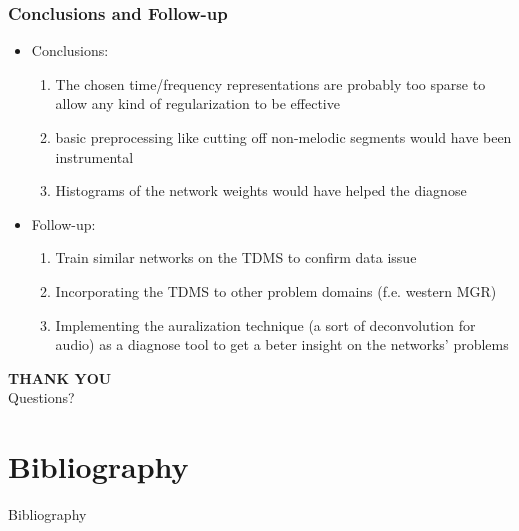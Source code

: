 \documentclass[hyperref={pdfpagelabels=false}]{beamer}
\begin{document}
     \begin{frame}
       \frametitle{Conclusions and Follow-up}
       \begin{itemize}
       \item \Large Conclusions:
         \begin{enumerate}
         \item The chosen time/frequency representations are probably too sparse to allow any kind of regularization to be effective
         \item basic preprocessing like cutting off non-melodic segments would have been instrumental
         \item Histograms of the network weights would have helped the diagnose
         \end{enumerate}
         \vspace{5mm}
       \item \Large Follow-up:
         \begin{enumerate}
         \item Train similar networks on the TDMS to confirm data issue
         \item Incorporating the TDMS to other problem domains (f.e. western MGR)
         \item Implementing the auralization technique\cite{choi-explaining} (a sort of deconvolution for audio) as a diagnose tool to get a beter insight on the networks' problems
         \end{enumerate}
       \end{itemize}
     \end{frame}

     
     \begin{frame}
       \begin{center}
         \Large \textbf{THANK YOU}\\[20pt]
         
       Questions?
       \end{center}
     \end{frame}
       

     \appendix
     \section{Bibliography}

     \begin{frame}[c] %
       \begin{center}
         \LARGE Bibliography
       \end{center}
     \end{frame}

     
     \begin{frame}[allowframebreaks]
       
       \tiny \printbibliography
     \end{frame}
\end{document}
